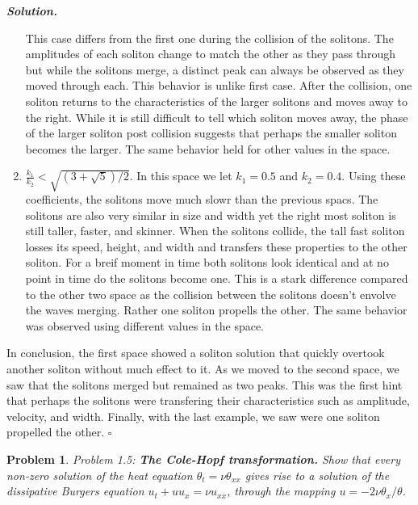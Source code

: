 \documentclass[12pt]{report}
\newtheorem{problem}{Problem}
\newenvironment{solution}[1][\it{Solution}]{\textbf{#1. } }{$\square$}
\begin{document}
\begin{solution}
\begin{enumerate}
        This case differs from the first one during the collision of the solitons.
        The amplitudes of each soliton change to match the other as they pass through but while the solitons merge, a distinct peak can always be observed as they moved through each. This behavior is unlike first case.
        After the collision, one soliton returns to the characteristics of the larger solitons and moves away to the right. 
        While it is still difficult to tell which soliton moves away, the phase of the larger soliton post collision suggests that perhaps the smaller soliton becomes the larger.
        The same behavior held for other values in the space. 
        \item $\frac{k_1}{k_2} < \sqrt{(3 + \sqrt{5})/2}$. In this space we let $k_1 = 0.5$ and $k_2 = 0.4$. Using these coefficients, the solitons move much slowr than the previous spacs. The solitons are also very similar in size and width yet the right most soliton is still taller, faster, and skinner.
        When the solitons collide, the tall fast soliton losses its speed, height, and width and transfers these properties to the other soliton. For a breif moment in time both solitons look identical and at no point in time do the solitons become one.  
        This is a stark difference compared to the other two space as the collision between the solitons doesn't envolve the waves merging. Rather one soliton propells the other. 
        The same behavior was observed using different values in the space. 
    \end{enumerate}     
    In conclusion, the first space showed a soliton solution that quickly overtook another soliton without much effect to it. As we moved to the second space, we saw that the solitons merged but remained as two peaks. This was the first hint that perhaps the solitons were transfering their characteristics such as amplitude, velocity, and width. Finally, with the last example, we saw were one soliton propelled the other.
\end{solution}

\vskip 20pt



\begin{problem}
    Problem 1.5: \textbf{The Cole-Hopf transformation.} Show that every non-zero solution of the heat equation $\theta_t = \nu\theta_{xx}$ gives rise to a solution of the dissipative Burgers equation $u_t + uu_x = \nu u_{xx}$, through the mapping $u = -2\nu\theta_x/\theta$.
\end{problem}
\end{document}
